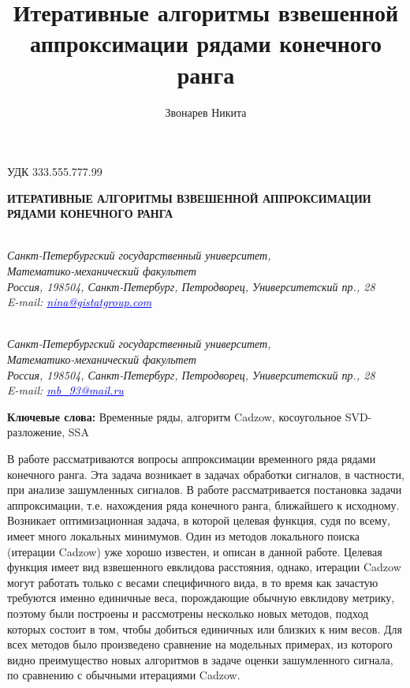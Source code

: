 \documentclass[12pt,a4paper,fleqn,leqno]{article}
\author{Звонарев Никита}
\title{Итеративные алгоритмы взвешенной аппроксимации рядами конечного ранга}
\begin{document}
\noindent УДК 333.555.777.99

\begin{center}{
\fontsize{18pt}{23pt}\selectfont\bf%
  \MakeUppercase{
 Итеративные алгоритмы взвешенной аппроксимации рядами конечного ранга
}}
\end{center}

\begin{center}{\\
\footnotesize\it Санкт-Петербургский государственный университет,\\
Математико-механический факультет
\\
\rm
Россия, 198504, Санкт-Петербург, Петродворец, Университетский пр., 28\\
E-mail: \textcolor {blue}{\underline{nina@gistatgroup.com}}}
\end{center}
\begin{center}{\bpv{}\\
\footnotesize\it Санкт-Петербургский государственный университет,\\
Математико-механический факультет
\\
\rm
Россия, 198504, Санкт-Петербург, Петродворец, Университетский пр., 28\\
E-mail: \textcolor {blue}{\underline{mb\_93@mail.ru}}}
\end{center}
\hspace{1.25cm}\begin{minipage}{12.16cm}\bpv\bpv\bmv \noindent
\footnotesize{\bf Ключевые слова:}\/ Временные ряды, алгоритм Cadzow, косоугольное SVD-разложение, SSA

\bpv\bpv\noindent  В работе рассматриваются вопросы аппроксимации временного ряда рядами конечного ранга. Эта задача возникает в задачах обработки сигналов, в частности, при анализе зашумленных сигналов. В работе рассматривается постановка задачи аппроксимации, т.е. нахождения ряда конечного ранга, ближайшего к исходному. Возникает оптимизационная задача, в которой целевая функция, судя по всему, имеет много локальных минимумов. Один из методов локального поиска (итерации Cadzow) уже хорошо известен, и описан в данной работе. Целевая функция имеет вид взвешенного евклидова расстояния, однако, итерации Cadzow могут работать только с весами специфичного вида, в то время как зачастую требуются именно единичные веса, порождающие обычную евклидову метрику, поэтому были построены и рассмотрены несколько новых методов, подход которых состоит в том, чтобы добиться единичных или близких к ним весов. Для всех методов было произведено сравнение на модельных примерах, из которого видно преимущество новых алгоритмов в задаче оценки зашумленного сигнала, по сравнению с обычными итерациями Cadzow.

\end{minipage}\bls\bmv
\end{document}
